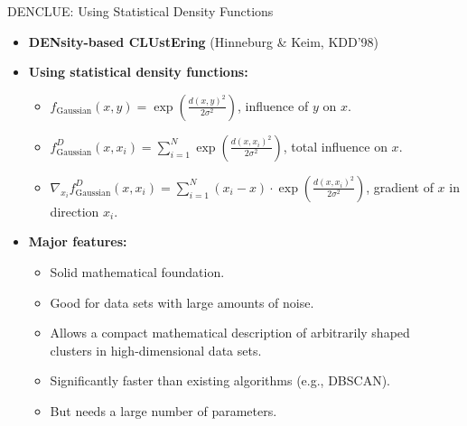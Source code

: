\begin{frame}{DENCLUE: Using Statistical Density Functions}
	\begin{itemize}
		\item \textbf{DENsity-based CLUstEring} (Hinneburg \& Keim, KDD'98)
		\item \textbf{Using statistical density functions:}
		\begin{itemize}
			\item $f_{\text{Gaussian}}(x,y)= 
			\exp\left(\frac{d(x,y)^2}{2\sigma^2}\right)$, influence of $y$ on 
			$x$.
			\item $f^D_{\text{Gaussian}}(x,x_i)= \sum_{i=1}^{N} 
			\exp\left(\frac{d(x,x_i)^2}{2\sigma^2}\right)$, total influence on 
			$x$.
			\item $\nabla_{x_i} f^D_{\text{Gaussian}}(x,x_i) = \sum_{i=1}^{N} 
			(x_i-x) \cdot \exp\left(\frac{d(x,x_i)^2}{2\sigma^2}\right)$, 
			gradient of $x$ in direction $x_i$.
		\end{itemize}
		\item \textbf{Major features:}
		\begin{itemize}
			\item Solid mathematical foundation.
			\item Good for data sets with large amounts of noise.
			\item Allows a compact mathematical description of arbitrarily 
			shaped \\
			clusters in high-dimensional data sets.
			\item Significantly faster than existing algorithms (e.g., DBSCAN).
			\item But needs a large number of parameters.
		\end{itemize}
	\end{itemize}
\end{frame}

